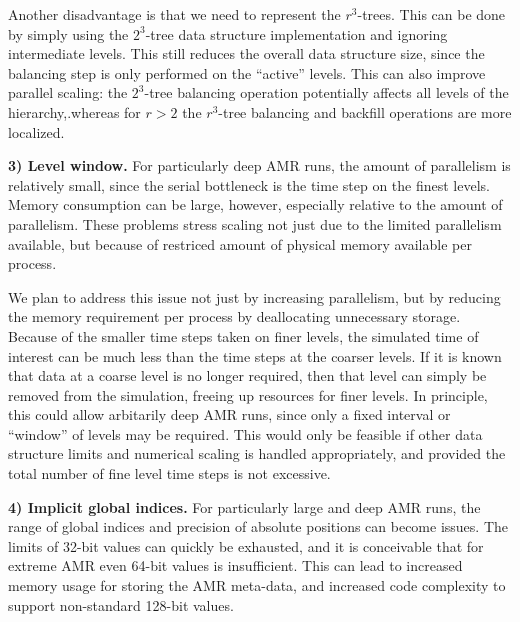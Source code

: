 \documentclass[10pt,twocolumn]{article}
\begin{document}


Another disadvantage is that we need to represent the $r^3$-trees.
This can be done by simply using the $2^3$-tree data structure
implementation and ignoring intermediate levels.  This still reduces
the overall data structure size, since the balancing step is only
performed on the ``active'' levels.  This can also improve parallel
scaling: the $2^3$-tree balancing operation potentially affects all
levels of the hierarchy,.whereas for $r>2$ the $r^3$-tree balancing
and backfill operations are more localized.


\textbf{3) Level window.}  For particularly deep AMR runs, the
amount of parallelism is relatively small, since the serial bottleneck
is the time step on the finest levels.  Memory consumption can be
large, however, especially relative to the amount of parallelism.
These problems stress scaling not just due to the limited parallelism
available, but because of restriced amount of physical memory
available per process.

We plan to address this issue not just by increasing parallelism, but
by reducing the memory requirement per process by deallocating
unnecessary storage.  Because of the smaller time steps taken on finer
levels, the simulated time of interest can be much less than the time
steps at the coarser levels.  If it is known that data at a coarse
level is no longer required, then that level can simply be removed
from the simulation, freeing up resources for finer levels.  In
principle, this could allow arbitarily deep AMR runs, since only a
fixed interval or ``window'' of levels may be required.  This would
only be feasible if other data structure limits and numerical scaling
is handled appropriately, and provided the total number of fine level
time steps is not excessive.

\textbf{4) Implicit global indices.}  For particularly large and deep
AMR runs, the range of global indices and precision of absolute
positions can become issues.  The limits of 32-bit values can quickly
be exhausted, and it is conceivable that for extreme AMR even 64-bit
values is insufficient.  This can lead to increased memory usage for
storing the AMR meta-data, and increased code complexity to support
non-standard 128-bit values.
\end{document}

